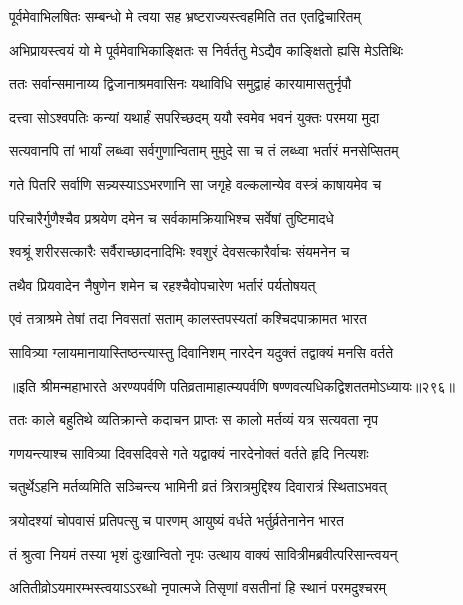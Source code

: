 \begin{center}
\twolineshloka
{पूर्वमेवाभिलषितः सम्बन्धो मे त्वया सह}
{भ्रष्टराज्यस्त्वहमिति तत एतद्विचारितम्}


\twolineshloka
{अभिप्रायस्त्वयं यो मे पूर्वमेवाभिकाङ्क्षितः}
{स निर्वर्ततु मेऽद्यैव काङ्क्षितो ह्यसि मेऽतिथिः}


\twolineshloka
{ततः सर्वान्समानाय्य द्विजानाश्रमवासिनः}
{यथाविधि समुद्वाहं कारयामासतुर्नृपौ}


\twolineshloka
{दत्त्वा सोऽश्वपतिः कन्यां यथार्हं सपरिच्छदम्}
{ययौ स्वमेव भवनं युक्तः परमया मुदा}


\twolineshloka
{सत्यवानपि तां भार्यां लब्ध्वा सर्वगुणान्विताम्}
{मुमुदे सा च तं लब्ध्वा भर्तारं मनसेप्सितम्}


\twolineshloka
{गते पितरि सर्वाणि सन्न्यस्याऽऽभरणानि सा}
{जगृहे वल्कलान्येव वस्त्रं काषायमेव च}


\twolineshloka
{परिचारैर्गुणैश्चैव प्रश्रयेण दमेन च}
{सर्वकामक्रियाभिश्च सर्वेषां तुष्टिमादधे}


\twolineshloka
{श्वश्रूं शरीरसत्कारैः सर्वैराच्छादनादिभिः}
{श्वशुरं देवसत्कारैर्वाचः संयमनेन च}


\twolineshloka
{तथैव प्रियवादेन नैषुणेन शमेन च}
{रहश्चैवोपचारेण भर्तारं पर्यतोषयत्}


\twolineshloka
{एवं तत्राश्रमे तेषां तदा निवसतां सताम्}
{कालस्तपस्यतां कश्चिदपाक्रामत भारत}


\twolineshloka
{सावित्र्या ग्लायमानायास्तिष्ठन्त्यास्तु दिवानिशम्}
{नारदेन यदुक्तं तद्वाक्यं मनसि वर्तते}


॥इति श्रीमन्महाभारते अरण्यपर्वणि
पतिव्रतामाहात्म्यपर्वणि षण्णवत्यधिकद्विशततमोऽध्यायः॥२९६॥




\twolineshloka
{ततः काले बहुतिथे व्यतिक्रान्ते कदाचन}
{प्राप्तः स कालो मर्तव्यं यत्र सत्यवता नृप}


\twolineshloka
{गणयन्त्याश्च सावित्र्या दिवसदिवसे गते}
{यद्वाक्यं नारदेनोक्तं वर्तते हृदि नित्यशः}


\twolineshloka
{चतुर्थेऽहनि मर्तव्यमिति सञ्चिन्त्य भामिनी}
{व्रतं त्रिरात्रमुद्दिश्य दिवारात्रं स्थिताऽभवत्}


\twolineshloka
{त्रयोदश्यां चोपवासं प्रतिपत्सु च पारणम्}
{आयुष्यं वर्धते भर्तुर्व्रतेनानेन भारत}


\twolineshloka
{तं श्रुत्वा नियमं तस्या भृशं दुःखान्वितो नृपः}
{उत्थाय वाक्यं सावित्रीमब्रवीत्परिसान्त्वयन्}


\twolineshloka
{अतितीव्रोऽयमारम्भस्त्वयाऽऽरब्धो नृपात्मजे}
{तिसृणां वसतीनां हि स्थानं परमदुश्चरम्}


\end{center}
